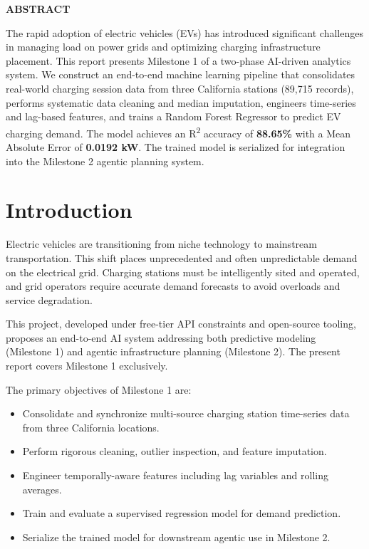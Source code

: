 \documentclass[12pt, a4paper]{article}
\begin{document}
\begin{mdframed}[
  linecolor=mainblue,
  linewidth=1pt,
  backgroundcolor=lightgray,
  innerleftmargin=14pt,
  innerrightmargin=14pt,
  innertopmargin=12pt,
  innerbottommargin=12pt,
  roundcorner=4pt
]
{\centering\small\bfseries\color{midgray}\MakeUppercase{Abstract}\par\vspace{8pt}}
\noindent
The rapid adoption of electric vehicles (EVs) has introduced significant challenges
in managing load on power grids and optimizing charging infrastructure placement.
This report presents Milestone 1 of a two-phase AI-driven analytics system.
We construct an end-to-end machine learning pipeline that consolidates real-world
charging session data from three California stations (89,715 records), performs
systematic data cleaning and median imputation, engineers time-series and lag-based
features, and trains a Random Forest Regressor to predict EV charging demand.
The model achieves an R\textsuperscript{2} accuracy of \textbf{88.65\%} with a
Mean Absolute Error of \textbf{0.0192 kW}. The trained model is serialized for
integration into the Milestone 2 agentic planning system.
\end{mdframed}

\vspace{1em}

\section{Introduction}

Electric vehicles are transitioning from niche technology to mainstream transportation.
This shift places unprecedented and often unpredictable demand on the electrical grid.
Charging stations must be intelligently sited and operated, and grid operators require
accurate demand forecasts to avoid overloads and service degradation.

This project, developed under free-tier API constraints and open-source tooling,
proposes an end-to-end AI system addressing both predictive modeling (Milestone 1)
and agentic infrastructure planning (Milestone 2). The present report covers
Milestone 1 exclusively.

The primary objectives of Milestone 1 are:

\begin{itemize}
  \item Consolidate and synchronize multi-source charging station time-series data from three California locations.
  \item Perform rigorous cleaning, outlier inspection, and feature imputation.
  \item Engineer temporally-aware features including lag variables and rolling averages.
  \item Train and evaluate a supervised regression model for demand prediction.
  \item Serialize the trained model for downstream agentic use in Milestone 2.
\end{itemize}
\end{document}
